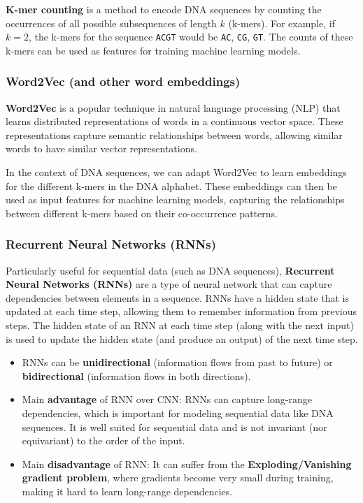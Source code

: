 \documentclass[a4paper]{article}
\begin{document}
\textbf{K-mer counting} is a method to encode DNA sequences by counting the
occurrences of all possible subsequences of length $k$ (k-mers). For example,
if $k=2$, the k-mers for the sequence \texttt{ACGT} would be \texttt{AC}, \texttt{CG},
\texttt{GT}. The counts of these k-mers can be used as features for training
machine learning models.

\subsubsection*{Word2Vec (and other word embeddings)}

\textbf{Word2Vec} is a popular technique in natural language processing (NLP)
that learns distributed representations of words in a continuous vector space.
These representations capture semantic relationships between words, allowing
similar words to have similar vector representations.

In the context of DNA sequences, we can adapt Word2Vec to learn embeddings for
the different k-mers in the DNA alphabet. These embeddings can then be used as
input features for machine learning models, capturing the relationships between
different k-mers based on their co-occurrence patterns.

\subsubsection*{Recurrent Neural Networks (RNNs)}

Particularly useful for sequential data (such as DNA sequences), \textbf{Recurrent
Neural Networks (RNNs)} are a type of neural network that can capture dependencies
between elements in a sequence. RNNs have a hidden state that is updated at each
time step, allowing them to remember information from previous steps. The hidden state
of an RNN at each time step (along with the next input) is used to update the hidden
state (and produce an output) of the next time step.

\begin{itemize}
  \item RNNs can be \textbf{unidirectional} (information flows from past to future) or
  \textbf{bidirectional} (information flows in both directions). 
  \item Main \textbf{advantage} of RNN over CNN: RNNs can capture long-range dependencies,
  which is important for modeling sequential data like DNA sequences. It is well 
  suited for sequential data and is not invariant (nor equivariant) to the order of
  the input.
  
  \item Main \textbf{disadvantage} of RNN: It can suffer from the \textbf{Exploding/Vanishing gradient problem},
  where gradients become very small during training, making it hard to learn long-range
  dependencies.
\end{itemize}
\end{document}
